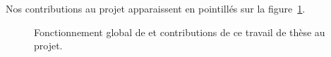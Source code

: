 Nos contributions au projet {\tom} apparaissent en pointillés sur la
figure~\ref{fig:wholeTomProcessContrib}.


\begin{figure}[h]
  \begin{center}
    
  \end{center}
  \caption{Fonctionnement global de {\tom} et contributions de ce travail de thèse au projet.}
  \label{fig:wholeTomProcessContrib}
\end{figure}



%
%
%
%

